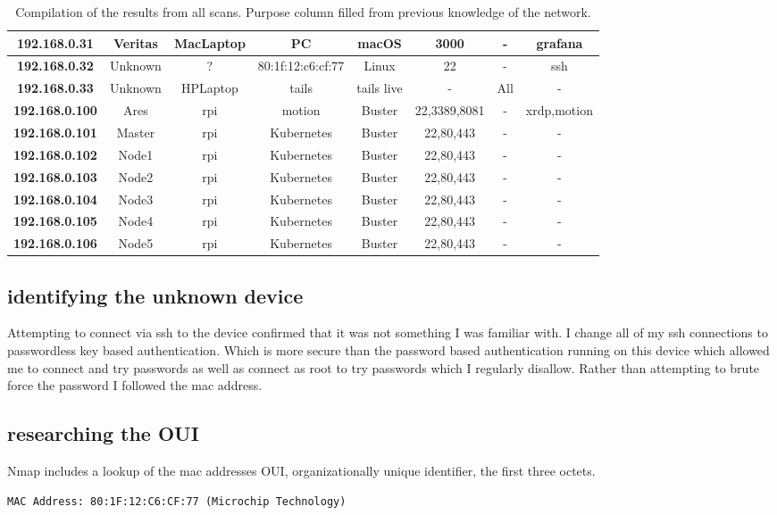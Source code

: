 \documentclass[10pt]{article}
\begin{document}
\begin{table}[H]
\begin{center}
\begin{tabular}{ | c | c | c | c | c | c | c | c | }
   \hline
   \textbf{192.168.0.31} & Veritas & MacLaptop & PC & macOS & 3000 & - & grafana \\
   \hline
   \textbf{192.168.0.32} & Unknown & ? & 80:1f:12:c6:cf:77 & Linux & 22 & - & ssh \\
   \hline
   \textbf{192.168.0.33} & Unknown & HPLaptop & tails & tails live & - & All & - \\  
   \hline
   \textbf{192.168.0.100}  & Ares & rpi & motion & Buster & 22,3389,8081 & - & xrdp,motion \\  
   \hline
   \textbf{192.168.0.101}  & Master & rpi & Kubernetes & Buster & 22,80,443 & - & - \\  
   \hline
   \textbf{192.168.0.102}  & Node1 & rpi & Kubernetes & Buster & 22,80,443 & - & - \\  
   \hline
   \textbf{192.168.0.103}  & Node2 & rpi & Kubernetes & Buster & 22,80,443 & - & - \\  
   \hline
   \textbf{192.168.0.104}  & Node3 & rpi & Kubernetes & Buster & 22,80,443 & - & - \\  
   \hline
   \textbf{192.168.0.105}  & Node4 & rpi & Kubernetes & Buster & 22,80,443 & - & - \\  
   \hline
   \textbf{192.168.0.106}  & Node5 & rpi & Kubernetes & Buster & 22,80,443 & - & - \\  
   \hline
  \end{tabular}
  \caption{Compilation of the results from all scans. Purpose column filled from previous knowledge of the network.}
  \label{local table}
  \end{center}
  \end{table}

\subsection*{identifying the unknown device}
Attempting to connect via ssh to the device confirmed that it was not something I was familiar with. I change all of my ssh
connections to passwordless key based authentication. Which is more secure than the password based authentication
running on this device which allowed me to connect and try passwords as well as connect as root to try passwords which 
I regularly disallow. Rather than attempting to brute force the password I followed the mac address.

\subsection*{researching the OUI}
Nmap includes a lookup of the mac addresses OUI, organizationally unique identifier, the first three octets.
\begin{verbatim}
MAC Address: 80:1F:12:C6:CF:77 (Microchip Technology)
\end{verbatim}
\end{document}
